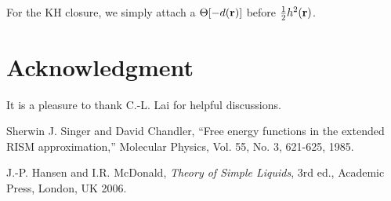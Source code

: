 \documentclass[12pt]{article}
\begin{document}
For the KH closure, we simply attach a $\Theta[-d(\mathbf{r})]$ before $\tfrac{1}{2}h^2(\mathbf{r})$.



\section*{Acknowledgment}
It is a pleasure to thank C.-L. Lai for helpful discussions.


\begin{thebibliography}{100}

  Sherwin J. Singer and David Chandler,
  ``Free energy functions in the extended RISM approximation,''
  Molecular Physics, Vol. 55, No. 3, 621-625,
  1985.

  J.-P. Hansen and I.R. McDonald,
  {\it Theory of Simple Liquids}, 3rd ed.,
  Academic Press, London, UK 2006.

\end{thebibliography}
\end{document}
